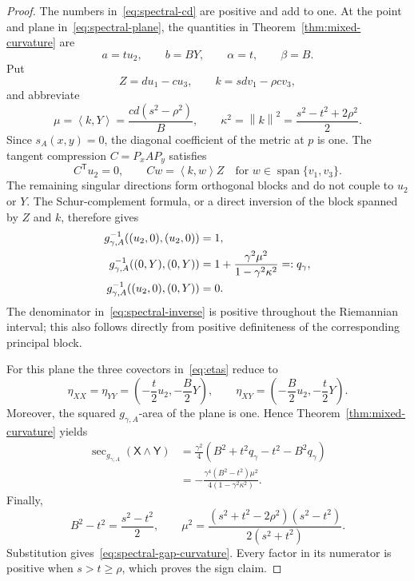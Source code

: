 \documentclass[11pt]{amsart}
\theoremstyle{definition}
\theoremstyle{remark}
\DeclareMathOperator{\spanop}{span}
\DeclareMathOperator{\secop}{sec}
\newcommand{\ip}[2]{\left\langle #1,#2\right\rangle}
\newcommand{\norm}[1]{\left\lVert #1\right\rVert}
\begin{document}
\begin{proof}
The numbers in~\eqref{eq:spectral-cd} are positive and add to one.
At the point and plane in~\eqref{eq:spectral-plane}, the quantities in
Theorem~\ref{thm:mixed-curvature} are
\[
 a=tu_2,\qquad b=BY,\qquad \alpha=t,\qquad \beta=B.
\]
Put
\[
 Z=du_1-cu_3,\qquad
 k=sdv_1-\rho cv_3,
\]
and abbreviate
\begin{equation}\label{eq:spectral-mu-kappa}
 \mu=\ip{k}{Y}=\frac{cd(s^2-\rho^2)}{B},
 \qquad
 \kappa^2=\norm{k}^2
 =\frac{s^2-t^2+2\rho^2}{2}.
\end{equation}
Since $s_A(x,y)=0$, the diagonal coefficient of the metric at $p$ is
one.  The tangent compression $C=P_xAP_y$ satisfies
\[
 C^{\mathsf T}u_2=0,
 \qquad
 Cw=\ip{k}{w}Z
 \quad\text{for }w\in\spanop\{v_1,v_3\}.
\]
The remaining singular directions form orthogonal blocks and do not
couple to $u_2$ or $Y$.  The Schur-complement formula, or a direct
inversion of the block spanned by $Z$ and $k$, therefore gives
\begin{align}
 g_{\gamma,A}^{-1}((u_2,0),(u_2,0))&=1,\notag\\
 g_{\gamma,A}^{-1}((0,Y),(0,Y))
 &=1+\frac{\gamma^2\mu^2}{1-\gamma^2\kappa^2}
 =:q_\gamma,                                      \label{eq:spectral-inverse}\\
 g_{\gamma,A}^{-1}((u_2,0),(0,Y))&=0.\notag
\end{align}
The denominator in~\eqref{eq:spectral-inverse} is positive throughout
the Riemannian interval; this also follows directly from positive
definiteness of the corresponding principal block.

For this plane the three covectors in~\eqref{eq:etas} reduce to
\[
 \eta_{XX}=\eta_{YY}
 =\left(-\frac t2u_2,-\frac B2Y\right),
 \qquad
 \eta_{XY}
 =\left(-\frac B2u_2,-\frac t2Y\right).
\]
Moreover, the squared $g_{\gamma,A}$-area of the plane is one.  Hence
Theorem~\ref{thm:mixed-curvature} yields
\begin{align*}
 \secop_{g_{\gamma,A}}(\mathsf X\wedge\mathsf Y)
 &=\frac{\gamma^2}{4}
   \left(B^2+t^2q_\gamma-t^2-B^2q_\gamma\right)\\
 &=-\frac{\gamma^4(B^2-t^2)\mu^2}
          {4(1-\gamma^2\kappa^2)}.
\end{align*}
Finally,
\[
 B^2-t^2=\frac{s^2-t^2}{2},
 \qquad
 \mu^2=
 \frac{(s^2+t^2-2\rho^2)(s^2-t^2)}{2(s^2+t^2)}.
\]
Substitution gives~\eqref{eq:spectral-gap-curvature}.  Every factor in
its numerator is positive when $s>t\geq\rho$, which proves the sign
claim.
\end{proof}
\end{document}
